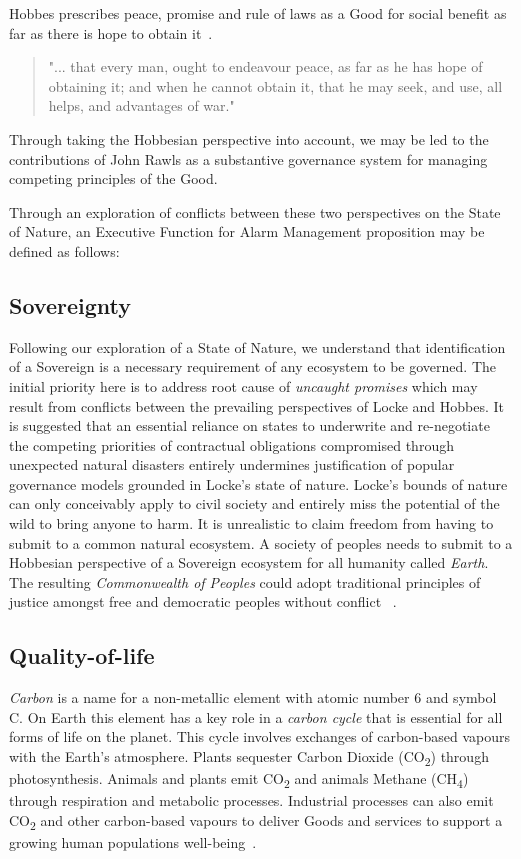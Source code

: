 \documentclass[11pt, oneside]{article}   	%
\begin{document}
Hobbes prescribes peace, promise and rule of laws as a Good for social benefit as far as there is hope to obtain it~\cite{th1}.

\begin{quote}
"... that every man, ought to endeavour peace, as far as he has hope of obtaining it; and when he cannot obtain it, that he may seek, and use, all helps, and advantages of war."
\end{quote}
Through taking the Hobbesian perspective into account, we may be led to the contributions of John Rawls as a substantive governance system for managing competing principles of the Good.\

Through an exploration of conflicts between these two perspectives on the State of Nature, an Executive Function for Alarm Management proposition may be defined as follows:\

\subsection{Sovereignty}
Following our exploration of a State of Nature, we understand that identification of a Sovereign is a necessary requirement of any ecosystem to be governed.
The initial priority here is to address root cause of \emph{uncaught promises} which may result from conflicts between the prevailing perspectives of Locke and Hobbes.
It is suggested that an essential reliance on states to underwrite and re-negotiate the competing priorities of contractual obligations compromised through unexpected natural disasters entirely undermines justification of popular governance models grounded in Locke's state of nature.
Locke's bounds of nature can only conceivably apply to civil society and entirely miss the potential of the wild to bring anyone to harm.
It is unrealistic to claim freedom from having to submit to a common natural ecosystem.
A society of peoples needs to submit to a Hobbesian perspective of a Sovereign ecosystem for all humanity called \emph{Earth}.
The resulting \emph{Commonwealth of Peoples} could adopt traditional principles of justice amongst free and democratic peoples without conflict ~\cite{jr2}.\

\subsection{Quality-of-life}
\emph{Carbon} is a name for a non-metallic element with atomic number 6 and symbol C.
On Earth this element has a key role in a \emph{carbon cycle} that is essential for all forms of life on the planet.
This cycle involves exchanges of carbon-based vapours with the Earth's atmosphere.
Plants sequester Carbon Dioxide (CO\textsubscript{2}) through photosynthesis.
Animals and plants emit CO\textsubscript{2} and animals Methane (CH\textsubscript{4}) through respiration and metabolic processes.
Industrial processes can also emit CO\textsubscript{2} and other carbon-based vapours to deliver Goods and services to support a growing human populations well-being~\cite{ng1}.\
\end{document}
